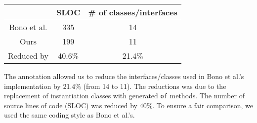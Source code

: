 \vspace{5pt}
\hspace{80pt}\begin{tabular}{ccc}
\hline
            & SLOC   & \# of classes/interfaces \\ \hline
Bono et al. & 335    & 14                       \\
Ours        & 199    & 11                       \\
\rowcolor[HTML]{C0C0C0} 
Reduced by  & 40.6\% & 21.4\%                   \\ \hline
\end{tabular}
\vspace{5pt}

\noindent The \mixin annotation allowed us to reduce the interfaces/classes used
in Bono et al.'s implementation by 21.4\% (from 14 to 11). The
reductions was due to the replacement of instantiation classes with
generated \texttt{of} methods. The number of source lines of code (SLOC)
was reduced by 40\%. 
To ensure a fair comparison, we used the same coding style as Bono et al.'s.
